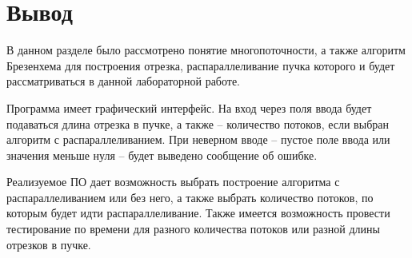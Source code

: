 \section{Вывод}

В данном разделе было рассмотрено понятие многопоточности, а также алгоритм Брезенхема для построения отрезка, распараллеливание пучка которого и будет рассматриваться в данной лабораторной работе.

Программа имеет графический интерфейс. На вход через поля ввода будет подаваться длина отрезка в пучке, а также -- количество потоков, если выбран алгоритм с распараллеливанием.
При неверном вводе -- пустое поле ввода или значения меньше нуля -- будет выведено сообщение об ошибке. 

Реализуемое ПО дает возможность выбрать построение алгоритма с распараллеливанием или без него, а также выбрать количество потоков, по которым будет идти распараллеливание. Также имеется возможность провести тестирование по времени для разного количества потоков или разной длины отрезков в пучке.
